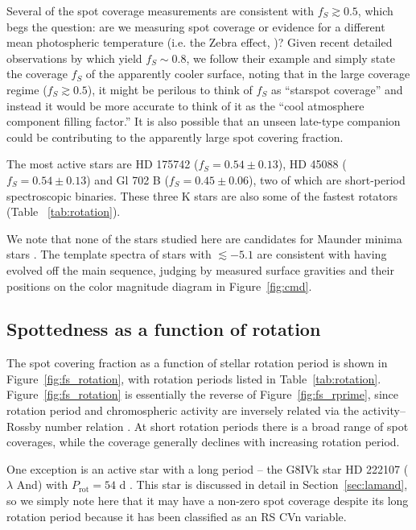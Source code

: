 Several of the spot coverage measurements are consistent with $f_S \gtrsim 0.5$, which begs the question: are we measuring spot coverage or evidence for a different mean photospheric temperature (i.e. the Zebra effect, \citealt{Pettersen1992})? Given recent detailed observations by \citet{Gully2017} which yield $f_S \sim 0.8$, we follow their example and simply state the coverage $f_S$ of the apparently cooler surface, noting that in the large coverage regime ($f_S \gtrsim 0.5$), it might be perilous to think of $f_S$ as ``starspot coverage'' and instead it would be more accurate to think of it as the ``cool atmosphere component filling factor.'' It is also possible that an unseen late-type companion could be contributing to the apparently large spot covering fraction. 

The most active stars are HD 175742 ($f_S = 0.54 \pm 0.13$), HD 45088 ($f_S = 0.54 \pm 0.13$) and Gl 702 B ($f_S = 0.45 \pm 0.06$), 
two of which are short-period spectroscopic binaries.
These three K stars are also some of the fastest rotators (Table ~\ref{tab:rotation}). 

We note that none of the stars studied here are candidates for Maunder minima stars \citep{Wright2004b}. The template spectra of stars with \logrprime $\lesssim -5.1$ are consistent with having evolved off the main sequence, judging by measured surface gravities and their positions on the color magnitude diagram in Figure~\ref{fig:cmd}. 

\subsection{Spottedness as a function of rotation}

The spot covering fraction as a function of stellar rotation period is shown in Figure~\ref{fig:fs_rotation}, with rotation periods listed in Table~\ref{tab:rotation}. 
Figure~\ref{fig:fs_rotation} is essentially the reverse of Figure~\ref{fig:fs_rprime}, since rotation period and chromospheric activity are inversely related 
via the activity--Rossby number relation \citep[i.e., faster rotators are more active;][]{Noyes1984}. At short rotation periods there is a broad range of spot coverages, while the coverage generally declines with increasing rotation period.

One exception is an active star with a long period -- the G8IVk star HD 222107 ($\lambda$ And) with $P_\mathrm{rot} = 54$ d \citep{Rutten1987}. This star is discussed in detail in Section~\ref{sec:lamand}, so we simply note here that it may have a non-zero spot coverage despite its long rotation period because it has been classified as an RS CVn variable. 


